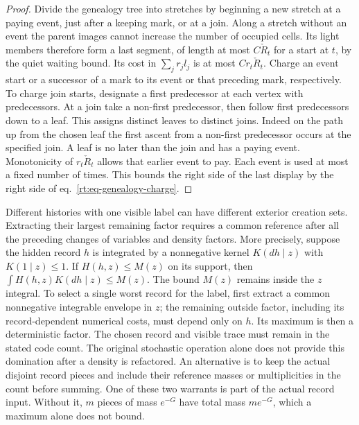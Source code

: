 \documentclass[11pt,letterpaper,reqno]{amsart}
\numberwithin{equation}{section}
\renewcommand{\eqref}[1]{\textup{eq.~\ref{#1}}}
\theoremstyle{definition}
\theoremstyle{remark}
\begin{document}
\begin{proof}
Divide the genealogy tree into stretches by beginning a new
stretch at a paying event, just after a keeping mark, or at
a join. Along a stretch without
an event the parent images cannot increase the number of
occupied cells. Its light members therefore form a last
segment, of length at most \(C\check R_t\) for a start at
\(t\), by the quiet waiting bound. Its cost in
\(\sum_j r_j l_j\) is at most \(C r_t\check R_t\).
Charge an event start or a successor of a mark to its event
or that preceding mark, respectively. To charge
join starts, designate a first predecessor at each vertex
with predecessors. At a join take a non-first predecessor,
then follow first predecessors down to a leaf. This assigns
distinct leaves to distinct joins. Indeed on the path up
from the chosen leaf the first ascent from a non-first
predecessor occurs at the specified join. A leaf is no later
than the join and has a paying event. Monotonicity of
\(r_t\check R_t\) allows that earlier event to pay.
Each event is used at most a fixed number of times.
This bounds the right side of the last display by the right
side of \eqref{rt:eq-genealogy-charge}.
\end{proof}

Different histories with one visible label can have different
exterior creation sets. Extracting their largest remaining factor
requires a common reference after all the preceding changes of
variables and density factors. More precisely, suppose the hidden
record $h$ is integrated by a nonnegative kernel $K(dh\mid z)$
with $K(1\mid z)\le1$. If $H(h,z)\le M(z)$ on its support,
then $\int H(h,z)K(dh\mid z)\le M(z)$. The bound $M(z)$
remains inside the $z$ integral. To select a single worst record
for the label, first extract a common nonnegative integrable
envelope in $z$; the remaining outside factor, including its
record-dependent numerical costs, must depend only on $h$.
Its maximum is then a deterministic factor. The chosen record
and visible trace must remain in the stated code count. The original stochastic operation alone
does not provide this domination after a density is refactored.
An alternative is to keep the actual disjoint record pieces and
include their reference masses or multiplicities in the count
before summing. One of these two warrants is part of the actual
record input. Without it, $m$ pieces of mass $e^{-G}$ have total
mass $m e^{-G}$, which a maximum alone does not bound.
\end{document}
